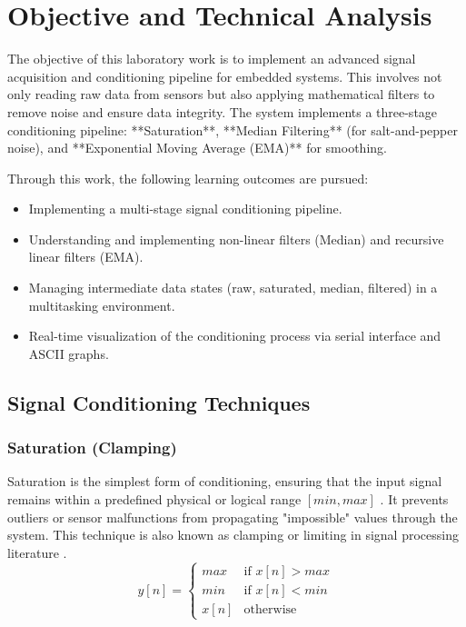 ﻿\newpage

\tableofcontents

\section{Objective and Technical Analysis}

The objective of this laboratory work is to implement an advanced signal acquisition and conditioning pipeline for embedded systems. This involves not only reading raw data from sensors but also applying mathematical filters to remove noise and ensure data integrity. The system implements a three-stage conditioning pipeline: **Saturation**, **Median Filtering** (for salt-and-pepper noise), and **Exponential Moving Average (EMA)** for smoothing.

Through this work, the following learning outcomes are pursued:
\begin{itemize}
    \item Implementing a multi-stage signal conditioning pipeline.
    \item Understanding and implementing non-linear filters (Median) and recursive linear filters (EMA).
    \item Managing intermediate data states (raw, saturated, median, filtered) in a multitasking environment.
    \item Real-time visualization of the conditioning process via serial interface and ASCII graphs.
\end{itemize}

\subsection{Signal Conditioning Techniques}

\subsubsection{Saturation (Clamping)}
Saturation is the simplest form of conditioning, ensuring that the input signal remains within a predefined physical or logical range $[min, max]$ \cite{signal_processing}. It prevents outliers or sensor malfunctions from propagating "impossible" values through the system. This technique is also known as clamping or limiting in signal processing literature \cite{oppenheim}.
\begin{equation}
y[n] = \begin{cases} 
max & \text{if } x[n] > max \\
min & \text{if } x[n] < min \\
x[n] & \text{otherwise}
\end{cases}
\end{equation}

